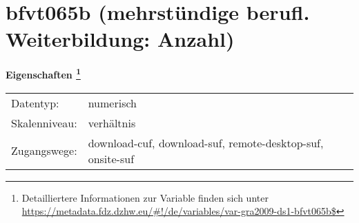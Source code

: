 
    \setcounter{footnote}{0}

    \vspace*{-1.8cm}
	\section{bfvt065b (mehrstündige berufl. Weiterbildung: Anzahl)}
	\label{section:bfvt065b}



    \vspace*{0.5cm}
    \noindent\textbf{Eigenschaften
	\footnote{Detailliertere Informationen zur Variable finden sich unter
		\url{https://metadata.fdz.dzhw.eu/\#!/de/variables/var-gra2009-ds1-bfvt065b$}}}\\
	\begin{tabularx}{\hsize}{@{}lX}
	Datentyp: & numerisch \\
	Skalenniveau: & verhältnis \\
	Zugangswege: &
	  download-cuf, 
	  download-suf, 
	  remote-desktop-suf, 
	  onsite-suf
 \\
    \end{tabularx}



